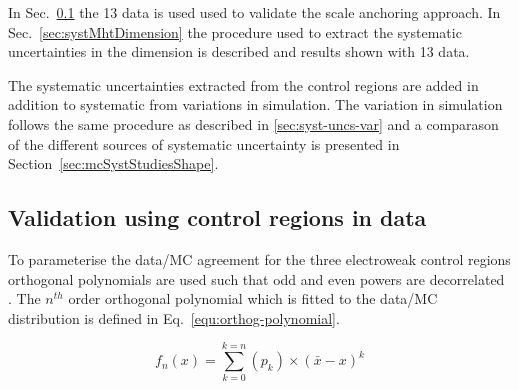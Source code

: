 In Sec.~\ref{sec:valid13} the 13 \TeV data is used used 
to validate the scale anchoring approach. 
In Sec.~\ref{sec:systMhtDimension} 
the procedure used to extract the systematic uncertainties in the 
\mht dimension is described and results shown with 13 \TeV data. 

The systematic uncertainties extracted from the control regions
are added in addition to systematic from variations in simulation.
The variation in simulation follows the same procedure as described in
\ref{sec:syst-uncs-var} and a comparason of the different sources of systematic uncertainty
is presented in Section~\ref{sec:mcSystStudiesShape}.

\subsection{Validation using control regions in data}
\label{sec:valid13}
To parameterise the data/MC agreement
for the three electroweak control regions
orthogonal polynomials are used such that odd and even powers 
are decorrelated \cite{cohen2013applied}. 
The $n^{th}$ order orthogonal polynomial which is fitted to the data/MC 
distribution is defined in Eq.~\ref{equ:orthog-polynomial}.

\begin{equation}
  \label{equ:orthog-polynomial}
  f_n(x) = \sum_{k=0}^{k=n}{(p_k)\times(\bar{x}-x)^k}
\end{equation}

